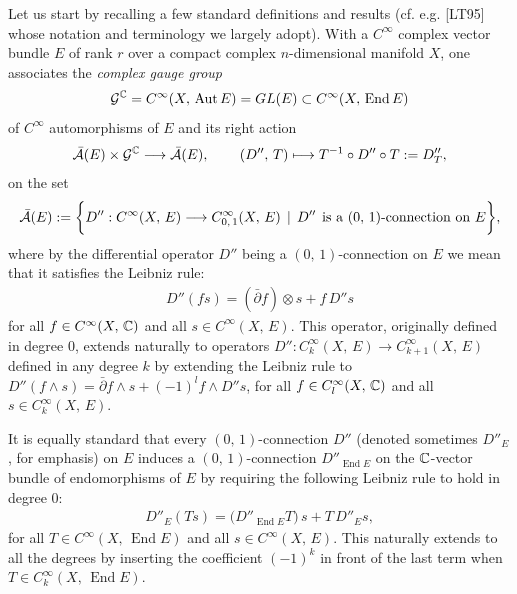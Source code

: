 \documentclass[12pt]{article}
\begin{document}
Let us start by recalling a few standard definitions and results (cf. e.g. [LT95] whose notation and terminology we largely adopt). With a $C^\infty$ complex vector bundle $E$ of rank $r$ over a compact complex $n$-dimensional manifold $X$, one associates the {\it complex gauge group} \begin{eqnarray*}{\cal G}^{\mathbb{C}} = C^\infty(X,\,\mbox{Aut}\,E) = GL(E)\subset C^\infty(X,\,\operatorname{End} E)\end{eqnarray*} of $C^\infty$ automorphisms of $E$ and its right action \begin{eqnarray}\label{eqn:G-C_action_A}\bar{\cal A}(E)\times{\cal G}^{\mathbb{C}} \longrightarrow \bar{\cal A}(E), \hspace{5ex} (D'',\, T)\longmapsto T^{-1}\circ D''\circ T:=D''_T,\end{eqnarray} on the set \begin{eqnarray*}\bar{\cal A}(E):=\bigg\{D'':C^\infty(X,\,E)\longrightarrow C^\infty_{0,\,1}(X,\,E)\,\mid\, D'' \hspace{1ex} \mbox{is a $(0,\,1)$-connection on $E$}\bigg\},\end{eqnarray*} where by the differential operator $D''$ being a $(0,\,1)$-connection on $E$ we mean that it satisfies the Leibniz rule: \begin{eqnarray*}D''(fs) = (\bar\partial f)\otimes s + f\,D''s\end{eqnarray*} for all $f\in C^\infty(X,\,\mathbb{C})$ and all $s\in C^\infty(X,\,E)$. This operator, originally defined in degree $0$, extends naturally to operators $D'':C^\infty_k(X,\,E)\longrightarrow C^\infty_{k+1}(X,\,E)$ defined in any degree $k$ by extending the Leibniz rule to $D''(f\wedge s) = \bar\partial f\wedge s + (-1)^l f\wedge D''s$, for all $f\in C^\infty_l(X,\,\mathbb{C})$ and all $s\in C^\infty_k(X,\,E)$.

  It is equally standard that every $(0,\,1)$-connection $D''$ (denoted sometimes $D''_E$, for emphasis) on $E$ induces a $(0,\,1)$-connection $D''_{\operatorname{End} E}$ on the $\mathbb{C}$-vector bundle of endomorphisms of $E$ by requiring the following Leibniz rule to hold in degree $0$: \begin{eqnarray}\label{eqn:Leibniz-rule_D_End}D''_E (Ts) = \bigg(D''_{\operatorname{End} E}T\bigg)\,s + T\,D''_E s,\end{eqnarray} for all $T\in C^\infty(X,\,\operatorname{End}E)$ and all $s\in C^\infty(X,\,E)$. This naturally extends to all the degrees by inserting the coefficient $(-1)^k$ in front of the last term when $T\in C^\infty_k(X,\,\operatorname{End}E)$.
\end{document}
